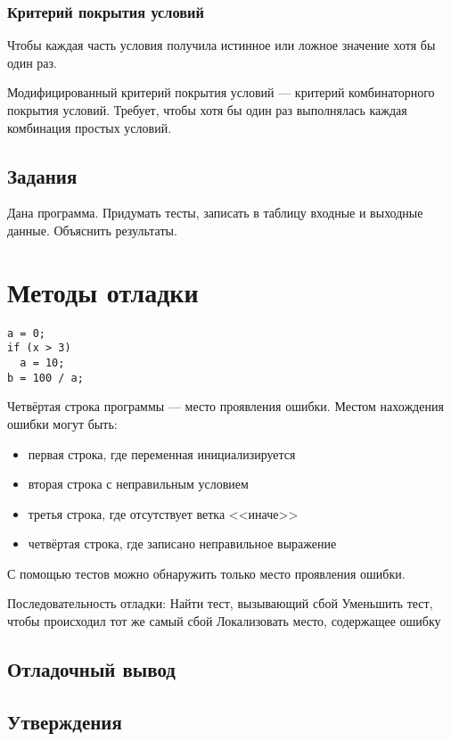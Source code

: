 \documentclass[14pt,openany]{book}
\begin{document}
\subsection{Критерий покрытия условий}

Чтобы каждая часть условия получила истинное или ложное
значение хотя бы один раз.

Модифицированный критерий покрытия условий --- критерий комбинаторного покрытия условий.
Требует, чтобы хотя бы один раз выполнялась каждая комбинация простых условий.

\section{Задания}

Дана программа. Придумать тесты, записать в таблицу входные и выходные данные.
Объяснить результаты.

\chapter{Методы отладки}

\begin{lstlisting}
a = 0;
if (x > 3)
  a = 10;
b = 100 / a;
\end{lstlisting}

Четвёртая строка программы --- место проявления ошибки.
Местом нахождения ошибки могут быть:
\begin{itemize}
\item первая строка, где переменная инициализируется
\item вторая строка с неправильным условием
\item третья строка, где отсутствует ветка <<иначе>>
\item четвёртая строка, где записано неправильное выражение
\end{itemize}

С помощью тестов можно обнаружить только место проявления ошибки.


Последовательность отладки:
Найти тест, вызывающий сбой
Уменьшить тест, чтобы происходил тот же самый сбой
Локализовать место, содержащее ошибку

\section{Отладочный вывод}

\section{Утверждения}
\end{document}
